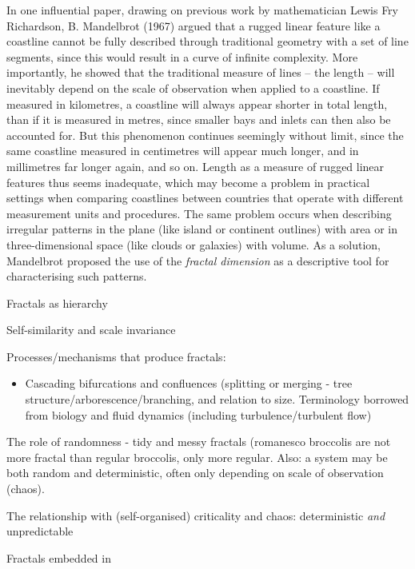 \documentclass[
  12pt,
]{book}
\providecommand{\tightlist}{%
  \setlength{\itemsep}{0pt}\setlength{\parskip}{0pt}}
\begin{document}
In one influential paper, drawing on previous work by mathematician Lewis Fry Richardson, B. Mandelbrot (1967) argued that a rugged linear feature like a coastline cannot be fully described through traditional geometry with a set of line segments, since this would result in a curve of infinite complexity. More importantly, he showed that the traditional measure of lines -- the length -- will inevitably depend on the scale of observation when applied to a coastline. If measured in kilometres, a coastline will always appear shorter in total length, than if it is measured in metres, since smaller bays and inlets can then also be accounted for. But this phenomenon continues seemingly without limit, since the same coastline measured in centimetres will appear much longer, and in millimetres far longer again, and so on. Length as a measure of rugged linear features thus seems inadequate, which may become a problem in practical settings when comparing coastlines between countries that operate with different measurement units and procedures. The same problem occurs when describing irregular patterns in the plane (like island or continent outlines) with area or in three-dimensional space (like clouds or galaxies) with volume. As a solution, Mandelbrot proposed the use of the \emph{fractal dimension} as a descriptive tool for characterising such patterns.

Fractals as hierarchy

Self-similarity and scale invariance

Processes/mechanisms that produce fractals:

\begin{itemize}
\tightlist
\item
  Cascading bifurcations and confluences (splitting or merging - tree structure/arborescence/branching, and relation to size. Terminology borrowed from biology and fluid dynamics (including turbulence/turbulent flow)
\end{itemize}

The role of randomness - tidy and messy fractals (romanesco broccolis are not more fractal than regular broccolis, only more regular. Also: a system may be both random and deterministic, often only depending on scale of observation (chaos).

The relationship with (self-organised) criticality and chaos: deterministic \emph{and} unpredictable

Fractals embedded in
\end{document}
